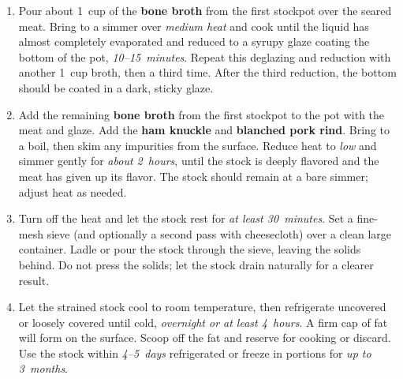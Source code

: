 \documentclass[11pt,letterpaper]{article}
\begin{document}
\begin{enumerate}
    \item Pour about 1~cup of the \textbf{bone broth} from the first stockpot over the seared meat. Bring to a simmer over \textit{medium heat} and cook until the liquid has almost completely evaporated and reduced to a syrupy glaze coating the bottom of the pot, \textit{10--15~minutes}. Repeat this deglazing and reduction with another 1~cup broth, then a third time. After the third reduction, the bottom should be coated in a dark, sticky glaze.

    \item Add the remaining \textbf{bone broth} from the first stockpot to the pot with the meat and glaze. Add the \textbf{ham knuckle} and \textbf{blanched pork rind}. Bring to a boil, then skim any impurities from the surface. Reduce heat to \textit{low} and simmer gently for \textit{about 2~hours}, until the stock is deeply flavored and the meat has given up its flavor. The stock should remain at a bare simmer; adjust heat as needed.

    \item Turn off the heat and let the stock rest for \textit{at least 30~minutes}. Set a fine-mesh sieve (and optionally a second pass with cheesecloth) over a clean large container. Ladle or pour the stock through the sieve, leaving the solids behind. Do not press the solids; let the stock drain naturally for a clearer result.

    \item Let the strained stock cool to room temperature, then refrigerate uncovered or loosely covered until cold, \textit{overnight or at least 4~hours}. A firm cap of fat will form on the surface. Scoop off the fat and reserve for cooking or discard. Use the stock within \textit{4--5~days} refrigerated or freeze in portions for \textit{up to 3~months}.
\end{enumerate}

\newpage
\end{document}
